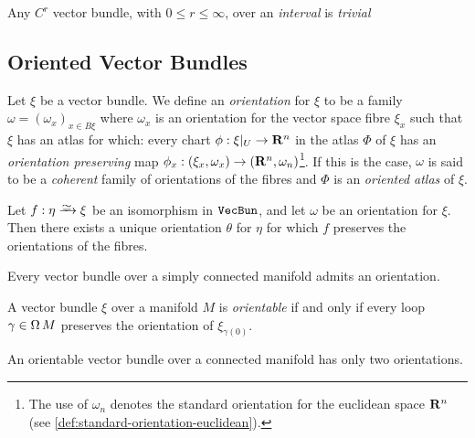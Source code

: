 \documentclass[../../../deep-dive]{subfile}
\begin{document}
\begin{corollary}
    \label{cor:smooth-vector-bundle-over-interval-is-trivial}
    Any \(C^r\) vector bundle, with \(0 \leq r \leq \infty\), over an
    \emph{interval} is \emph{trivial}
\end{corollary}

\subsection{Oriented Vector Bundles}

\begin{definition}
    \label{def:orientation-vector-bundle}
    Let \(\xi\) be a vector bundle. We define an \emph{orientation} for \(\xi\) to
    be a family \(\omega = (\omega_x)_{x \in B \xi}\) where \(\omega_x\) is an
    orientation for the vector space fibre \(\xi_x\) such that \(\xi\) has an atlas
    for which: every chart \(\phi: \xi|_U \to \mathbf{R}^n\) in the atlas \(\Phi\) of
    \(\xi\) has an \emph{orientation preserving} map
    \(\phi_x: (\xi_x, \omega_x) \to (\mathbf{R}^n, \omega_n)\)\footnote{The use of
        \(\omega_n\) denotes the standard orientation for the euclidean space \(\mathbf{R}^n\)
        (see \cref{def:standard-orientation-euclidean}).}. If this is the case,
    \(\omega\) is said to be a \emph{coherent} family of orientations of the fibres
    and \(\Phi\) is an \emph{oriented atlas} of \(\xi\).
\end{definition}

\begin{lemma}
    \label{lem:unique-orientation-from-vector-bundle-isomorphism}
    Let \(f: \eta \isoto \xi\) be an isomorphism in \({\texttt{VecBun}}\), and let \(\omega\)
    be an orientation for \(\xi\). Then there exists a unique orientation \(\theta\)
    for \(\eta\) for which \(f\) preserves the orientations of the fibres.
\end{lemma}

\begin{proposition}
    \label{thm:simply-connected-manifold-admits-orientation}
    Every vector bundle over a simply connected manifold admits an orientation.
\end{proposition}

\begin{proposition}
    \label{prop:vecbun-orientable-iff-loop-preserves-orientation}
    A vector bundle \(\xi\) over a manifold \(M\) is \emph{orientable} if and only
    if every loop \(\gamma \in \operatorname{\Omega} M\) preserves the orientation of
    \(\xi_{\gamma(0)}\).
\end{proposition}

\begin{corollary}
    \label{cor:orientable-vecbun-connected-manifold-2-orientations}
    An orientable vector bundle over a connected manifold has only two orientations.
\end{corollary}
\end{document}
